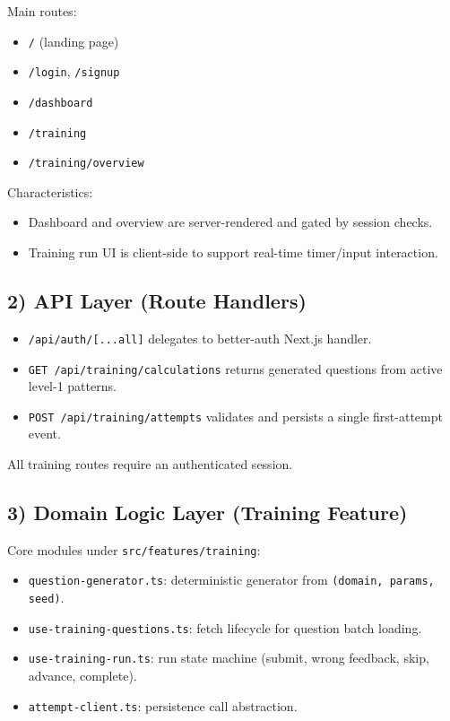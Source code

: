 \documentclass[11pt]{article}
\begin{document}
Main routes:

\begin{itemize}[leftmargin=*]
	\item \texttt{/} (landing page)
	\item \texttt{/login}, \texttt{/signup}
	\item \texttt{/dashboard}
	\item \texttt{/training}
	\item \texttt{/training/overview}
\end{itemize}

Characteristics:

\begin{itemize}[leftmargin=*]
	\item Dashboard and overview are server-rendered and gated by session checks.
	\item Training run UI is client-side to support real-time timer/input interaction.
\end{itemize}

\subsection*{2) API Layer (Route Handlers)}

\begin{itemize}[leftmargin=*]
	\item \texttt{/api/auth/[...all]} delegates to better-auth Next.js handler.
	\item \texttt{GET /api/training/calculations} returns generated questions from active level-1 patterns.
	\item \texttt{POST /api/training/attempts} validates and persists a single first-attempt event.
\end{itemize}

All training routes require an authenticated session.

\subsection*{3) Domain Logic Layer (Training Feature)}

Core modules under \texttt{src/features/training}:

\begin{itemize}[leftmargin=*]
	\item \texttt{question-generator.ts}: deterministic generator from \texttt{(domain, params, seed)}.
	\item \texttt{use-training-questions.ts}: fetch lifecycle for question batch loading.
	\item \texttt{use-training-run.ts}: run state machine (submit, wrong feedback, skip, advance, complete).
	\item \texttt{attempt-client.ts}: persistence call abstraction.
\end{itemize}
\end{document}
